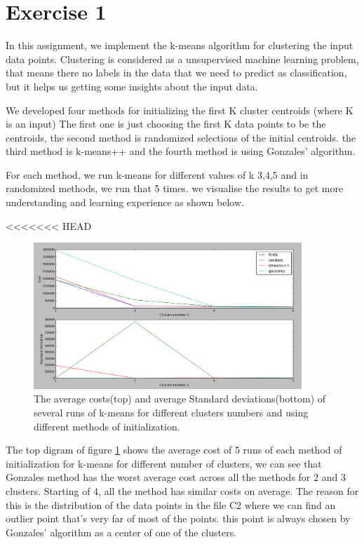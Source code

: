 \section*{Exercise 1}
In this assignment, we implement the k-means algorithm for clustering the input data points.
Clustering is considered as a unsupervised machine learning problem, that means there no labels in the data that we need to predict as classification, but it helps us getting some insights about the input data.

We developed four methods for initializing the first K cluster centroids (where K is an input)
The first one is just choosing the first K data points to be the centroids, the second method is randomized selections of the initial centroids. the third method is k-means++
and the fourth method is using Gonzales’ algorithm.

For each method, we run k-means for different values of k {3,4,5} and in randomized methods, we run that 5 times. we visualise the results to get more understanding and learning experience as shown below.

<<<<<<< HEAD

\begin{figure}[!htb]
\centering
\includegraphics[width=0.9\textwidth]{shots/std_mean.png}
\caption{The average costs(top) and average Standard deviations(bottom) of several runs of k-means for different clusters numbers and using different methods of initialization.}
\label{std_mean}
\end{figure}

The top digram of figure \ref{std_mean} shows the average cost of 5 runs of each method of initialization for k-means for different number of clusters, we can see that Gonzales method has the worst average cost across all the methods for 2 and 3 clusters. Starting of 4, all the method has similar costs on average. The reason for this is the distribution of the data points in the file C2 where we can find an outlier point that's very far of most of the points. this point is always chosen by Gonzales' algorithm as a center of one of the clusters.

